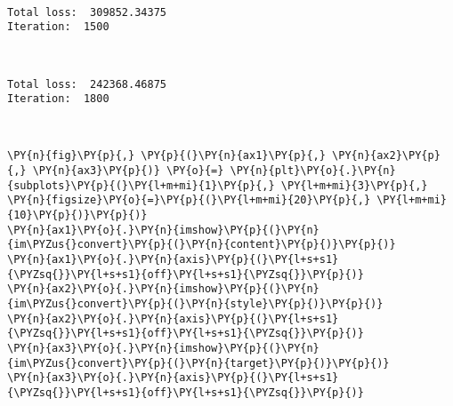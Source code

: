     \begin{center}
    \end{center}
    { \hspace*{\fill} \\}
    
    \begin{Verbatim}[commandchars=\\\{\}]
Total loss:  309852.34375
Iteration:  1500
    \end{Verbatim}

    \begin{center}
    \end{center}
    { \hspace*{\fill} \\}
    
    \begin{Verbatim}[commandchars=\\\{\}]
Total loss:  242368.46875
Iteration:  1800
    \end{Verbatim}

    \begin{center}
    \end{center}
    { \hspace*{\fill} \\}

    \begin{tcolorbox}[breakable, size=fbox, boxrule=1pt, pad at break*=1mm,colback=cellbackground, colframe=cellborder]
\begin{Verbatim}[commandchars=\\\{\}]
\PY{n}{fig}\PY{p}{,} \PY{p}{(}\PY{n}{ax1}\PY{p}{,} \PY{n}{ax2}\PY{p}{,} \PY{n}{ax3}\PY{p}{)} \PY{o}{=} \PY{n}{plt}\PY{o}{.}\PY{n}{subplots}\PY{p}{(}\PY{l+m+mi}{1}\PY{p}{,} \PY{l+m+mi}{3}\PY{p}{,} \PY{n}{figsize}\PY{o}{=}\PY{p}{(}\PY{l+m+mi}{20}\PY{p}{,} \PY{l+m+mi}{10}\PY{p}{)}\PY{p}{)}
\PY{n}{ax1}\PY{o}{.}\PY{n}{imshow}\PY{p}{(}\PY{n}{im\PYZus{}convert}\PY{p}{(}\PY{n}{content}\PY{p}{)}\PY{p}{)}
\PY{n}{ax1}\PY{o}{.}\PY{n}{axis}\PY{p}{(}\PY{l+s+s1}{\PYZsq{}}\PY{l+s+s1}{off}\PY{l+s+s1}{\PYZsq{}}\PY{p}{)}
\PY{n}{ax2}\PY{o}{.}\PY{n}{imshow}\PY{p}{(}\PY{n}{im\PYZus{}convert}\PY{p}{(}\PY{n}{style}\PY{p}{)}\PY{p}{)}
\PY{n}{ax2}\PY{o}{.}\PY{n}{axis}\PY{p}{(}\PY{l+s+s1}{\PYZsq{}}\PY{l+s+s1}{off}\PY{l+s+s1}{\PYZsq{}}\PY{p}{)}
\PY{n}{ax3}\PY{o}{.}\PY{n}{imshow}\PY{p}{(}\PY{n}{im\PYZus{}convert}\PY{p}{(}\PY{n}{target}\PY{p}{)}\PY{p}{)}
\PY{n}{ax3}\PY{o}{.}\PY{n}{axis}\PY{p}{(}\PY{l+s+s1}{\PYZsq{}}\PY{l+s+s1}{off}\PY{l+s+s1}{\PYZsq{}}\PY{p}{)}
\end{Verbatim}
\end{tcolorbox}

